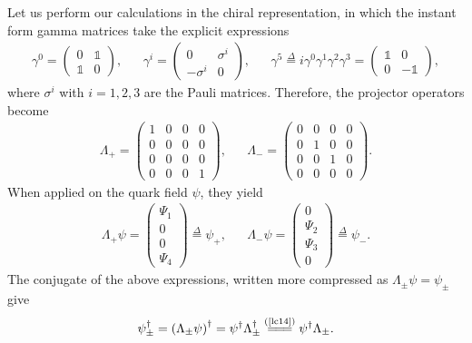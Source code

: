 \begin{note}\noindent
Let us perform our calculations in the chiral representation, in which the instant form gamma matrices take the explicit expressions
\begin{equation*}
\begin{aligned}
\gamma^0=\begin{pmatrix}
0 & \mathds{1}\\
\mathds{1} & 0
\end{pmatrix}, && \gamma^i=\begin{pmatrix}
0 & \sigma^i\\
-\sigma^i & 0
\end{pmatrix}, && \gamma^5\overset{\Delta}{=}i\gamma^0\gamma^1\gamma^2\gamma^3=\begin{pmatrix}
\mathds{1} & 0\\
0 & -\mathds{1}
\end{pmatrix},
\end{aligned}
\end{equation*}
where $\sigma^i$ with $i=1,2,3$ are the Pauli matrices. 
Therefore, the projector operators become
\begin{equation*}
\begin{aligned}
\Lambda_+=\begin{pmatrix}
1 & 0 & 0 & 0 \\
0 & 0 & 0 & 0 \\
0 & 0 & 0 & 0 \\
0 & 0 & 0 & 1
\end{pmatrix}, &&
\Lambda_-=\begin{pmatrix}
0 & 0 & 0 & 0 \\
0 & 1 & 0 & 0 \\
0 & 0 & 1 & 0 \\
0 & 0 & 0 & 0
\end{pmatrix}.
\end{aligned}
\end{equation*}
When applied on the quark field $\psi$, they yield
\begin{equation*}
\begin{aligned}
\Lambda_+\psi=\begin{pmatrix}
\Psi_1 \\
0 \\
0 \\
\Psi_4
\end{pmatrix}\overset{\Delta}{=}\psi_+, && \Lambda_-\psi=\begin{pmatrix}
0 \\
\Psi_2 \\
\Psi_3 \\
0
\end{pmatrix}\overset{\Delta}{=}\psi_-.
\end{aligned}
\end{equation*}
The conjugate of the above expressions, written more compressed as $\Lambda_\pm\psi=\psi_\pm$ give
\begin{align*}
\psi_\pm^\dag=\left(\Lambda_\pm\psi\right)^\dag=\psi^\dag\Lambda_\pm^\dag\stackrel{(\text{\cref{lc14}})}{=\joinrel=\joinrel=}\psi^\dag\Lambda_\pm.
\end{align*}
\end{note}

